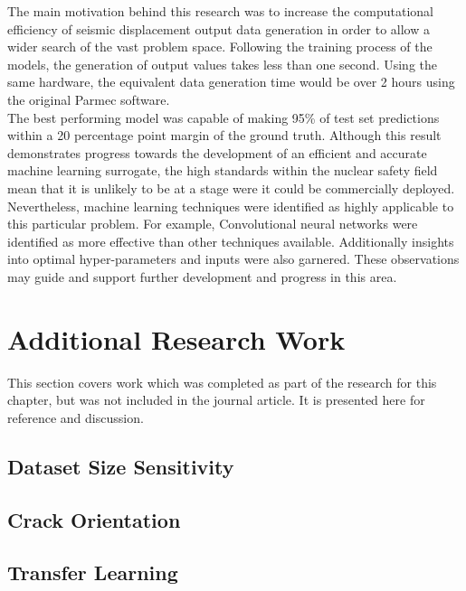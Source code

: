 \noindent
The main motivation behind this research was to increase the computational efficiency of seismic displacement output data generation in order to allow a wider search of the vast problem space. Following the training process of the models, the generation of output values takes less than one second. Using the same hardware, the equivalent data generation time would be over 2 hours using the original Parmec software.
\\

\noindent
The best performing model was capable of making 95\% of test set predictions within a 20 percentage point margin of the ground truth. Although this result demonstrates progress towards the development of an efficient and accurate machine learning surrogate, the high standards within the nuclear safety field mean that it is unlikely to be at a stage were it could be commercially deployed. Nevertheless, machine learning techniques were identified as highly applicable to this particular problem. For example, Convolutional neural networks were identified as more effective than other techniques available. Additionally insights into optimal hyper-parameters and inputs were also garnered. These observations may guide and support further development and progress in this area.

\section{Additional Research Work}

This section covers work which was completed as part of the research for this chapter, but was not included in the journal article. It is presented here for reference and discussion.

\subsection{Dataset Size Sensitivity}

\subsection{Crack Orientation}

\subsection{Transfer Learning}

    

